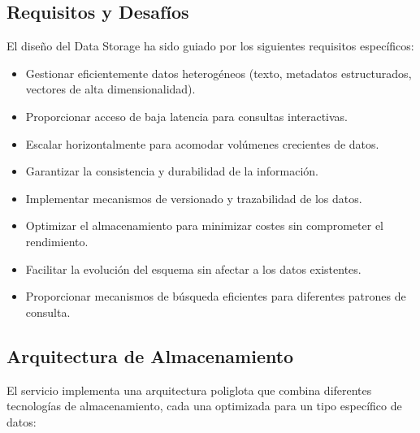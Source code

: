 \documentclass[12pt,a4paper]{article}
\begin{document}
\subsection{Requisitos y Desafíos}
\label{subsec:ds-requisitos}

El diseño del Data Storage ha sido guiado por los siguientes requisitos específicos:

\begin{itemize}
    \item Gestionar eficientemente datos heterogéneos (texto, metadatos estructurados, vectores de alta dimensionalidad).
    
    \item Proporcionar acceso de baja latencia para consultas interactivas.
    
    \item Escalar horizontalmente para acomodar volúmenes crecientes de datos.
    
    \item Garantizar la consistencia y durabilidad de la información.
    
    \item Implementar mecanismos de versionado y trazabilidad de los datos.
    
    \item Optimizar el almacenamiento para minimizar costes sin comprometer el rendimiento.
    
    \item Facilitar la evolución del esquema sin afectar a los datos existentes.
    
    \item Proporcionar mecanismos de búsqueda eficientes para diferentes patrones de consulta.
\end{itemize}

\subsection{Arquitectura de Almacenamiento}
\label{subsec:ds-arquitectura}

El servicio implementa una arquitectura poliglota que combina diferentes tecnologías de almacenamiento, cada una optimizada para un tipo específico de datos:
\end{document}
